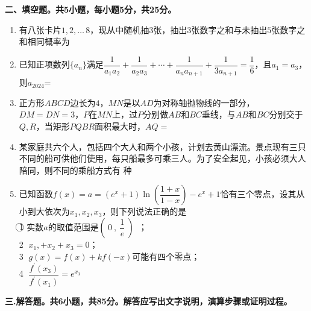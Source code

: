 \documentclass[11pt,a4paper]{ctexart}
\newcommand{\sectiontitle}[1]{
  \par\noindent\textbf{#1}\par%
  }
\begin{document}
\newpage
\sectiontitle{二、填空题。共5小题，每小题5分，共25分。}
\begin{enumerate}[start=11] %

    \item 有八张卡片$1,2,\ldots\,8$，现从中随机抽$3$张，抽出$3$张数字之和与未抽出$5$张数字之和相同概率为 \underline{\hspace{2cm}}

    \item 已知正项数列$\{a_n\}$满足$\dfrac{1}{a_1a_2}+ \dfrac{1}{a_2a_3}+ \cdots +\dfrac{1}{a_na_{n+1}}+\dfrac{1}{3a_{n+1}}=\dfrac{1}{6}$，且$a_1=a_3$，则$a_{2024}$=
    \underline{\hspace{2cm}}

    \item 正方形$ABCD$边长为$4$，$MN$是以$AD$为对称轴抛物线的一部分，$DM=DN=3$，$P$在$MN$上，过$P$分别做$AB$和$BC$垂线，与$AB$和$BC$分别交于$Q,R$，当矩形$PQBR$面积最大时，$AQ=$
    \underline{\hspace{2cm}}

    \item 某家庭共六个人，包括四个大人和两个小孩，计划去黄山漂流。景点现有三只不同的船可供他们使用，每只船最多可乘三人。为了安全起见，小孩必须大人陪同，则不同的乘船方式有
    \underline{\hspace{2cm}}种

    \item 已知函数$f(x) =a=(e^x+1) \ln (\dfrac{1+x}{1-x})-e^x+1$恰有三个零点，设其从小到大依次为$x_1,x_2,x_3$，则下列说法正确的是\underline{\hspace{2cm}}\\[1em]
    \textcircled{1}  实数$a$的取值范围是$(\ 0\ ,\ \dfrac{1}{e}\ )$\ ；\\
    \textcircled {2} $x_1,+x_2+x_3=0$；\\
    \textcircled {3} $g(x)=f(x)+kf(-x)$可能有四个零点；\\[0.4em]
    \textcircled {4} $\dfrac{f^{'}(x_3)}{f^{'}(x_1)}=e^{x_3}$ 
    
\end{enumerate}


\newpage
\sectiontitle{三.解答题。共6小题，共85分。解答应写出文字说明，演算步骤或证明过程。}
\end{document}
